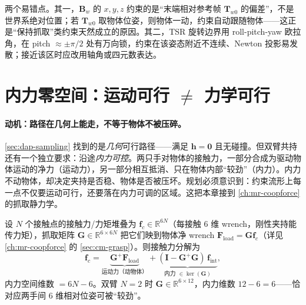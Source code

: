 \begin{pitfall}
两个易错点。其一，$\mathbf{B}_w$ 的 $x,y,z$ 约束的是“末端相对参考帧 $\mathbf{T}_{w0}$ 的偏差”，不是世界系绝对位置；若 $\mathbf{T}_{w0}$ 取物体位姿，则物体一动，约束自动跟随物体——这正是“保持抓取”类约束天然成立的原因。其二，TSR 旋转边界用 roll-pitch-yaw 欧拉角，在 pitch $\approx\pm\pi/2$ 处有万向锁，约束在该姿态附近不连续、Newton 投影易发散；接近该区时应改用轴角或四元数表达。
\end{pitfall}

\section{内力零空间：运动可行 \texorpdfstring{$\neq$}{!=} 力学可行}
\label{sec:dap-internalforce}

\paragraph{动机：路径在几何上能走，不等于物体不被压碎。}
\cref{sec:dap-sampling} 找到的是\emph{几何}可行路径——满足 $\mathbf{h}=\mathbf{0}$ 且无碰撞。但双臂共持还有一个独立要求：沿途\emph{内力可控}。两只手对物体的接触力，一部分合成为驱动物体运动的净力（运动力），另一部分相互抵消、只在物体内部“较劲”（内力）。内力不动物体，却决定夹持是否稳、物体是否被压坏。规划必须意识到：约束流形上每一点不仅要运动可行，还要落在内力可调的区域。这把本章接到 \cref{ch:mr-coopforce} 的抓取静力学。

\begin{definition}[抓取矩阵与内力零空间]\label{def:dap-grasp}
设 $N$ 个接触点的接触力/力矩堆叠为 $\mathbf{f}_c\in\mathbb{R}^{6N}$（每接触 $6$ 维 wrench，刚性夹持能传力矩），抓取矩阵 $\mathbf{G}\in\mathbb{R}^{6\times6N}$ 把它们映到物体净 wrench $\mathbf{F}_{\text{load}}=\mathbf{G}\mathbf{f}_c$（详见 \cref{ch:mr-coopforce} 的 \cref{sec:cm-grasp}）。则接触力分解为
\begin{equation}
  \mathbf{f}_c=\underbrace{\mathbf{G}^{+}\mathbf{F}_{\text{load}}}_{\text{运动力（动物体）}}+\underbrace{(\mathbf{I}-\mathbf{G}^{+}\mathbf{G})\,\mathbf{f}_{\text{int}}}_{\text{内力 }\in\ker(\mathbf{G})},
  \label{eq:dap-grasp}
\end{equation}
内力空间维数 $=6N-6$。双臂 $N=2$ 时 $\mathbf{G}\in\mathbb{R}^{6\times12}$，内力维数 $12-6=6$——恰对应两手间 $6$ 维相对位姿可被“较劲”。
\end{definition}

